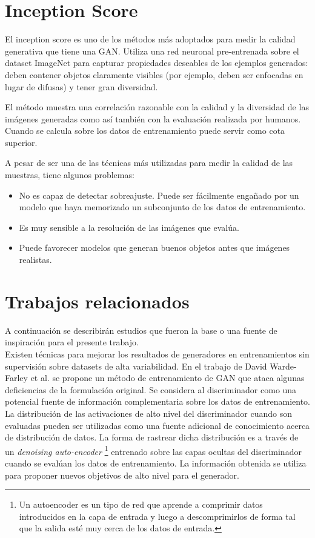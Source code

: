 \documentclass[spanish]{report}
\begin{document}
\section{Inception Score} \label{inception_score}

El inception score \cite{inception_score} \cite{pros_cons_gan_evaluation} es uno de los métodos más adoptados para medir la calidad generativa que tiene una GAN. Utiliza una red neuronal pre-entrenada sobre el dataset ImageNet \cite{imagenet_cvpr09} para capturar propiedades deseables de los ejemplos generados: deben contener objetos claramente visibles (por ejemplo, deben ser enfocadas en lugar de difusas) y tener gran diversidad.

El método muestra una correlación razonable con la calidad y la diversidad de las imágenes generadas como así también con la evaluación realizada por humanos. Cuando se calcula sobre los datos de entrenamiento puede servir como cota superior.

A pesar de ser una de las técnicas más utilizadas para medir la calidad de las muestras, tiene algunos problemas:

\begin{itemize}
\item  No es capaz de detectar sobreajuste. Puede ser fácilmente engañado por un modelo que haya memorizado un subconjunto de los datos de entrenamiento.
\item Es muy sensible a la resolución de las imágenes que evalúa.
\item Puede favorecer modelos que generan buenos objetos antes que imágenes realistas.
\end{itemize}



\section{Trabajos relacionados}

A continuación se describirán estudios que fueron la base o una fuente de inspiración para el presente trabajo.\\

Existen técnicas para mejorar los resultados de generadores en entrenamientos sin supervisión sobre datasets de alta variabilidad. En el trabajo de David Warde-Farley et al. \cite{warde-farley+al-2017-denoisegan-iclr} se propone un método de entrenamiento de GAN que ataca algunas deficiencias de la formulación original. Se considera al discriminador como una potencial fuente de información complementaria sobre los datos de entrenamiento. La distribución de las activaciones de alto nivel del discriminador cuando son evaluadas pueden ser utilizadas como una fuente adicional de conocimiento acerca de distribución de datos. La forma de rastrear dicha distribución es a través de un \textit{denoising auto-encoder} \footnote{Un autoencoder es un tipo de red que aprende a comprimir datos introducidos en la capa de entrada y luego a descomprimirlos de forma tal que la salida esté muy cerca de los datos de entrada.} entrenado sobre las capas ocultas del discriminador cuando se evalúan los datos de entrenamiento. La información obtenida se utiliza para proponer nuevos objetivos de alto nivel para el generador.
\end{document}
